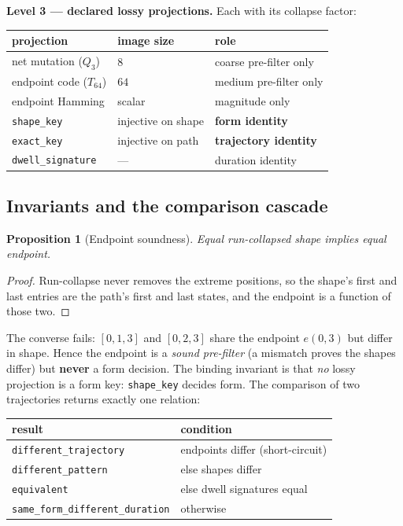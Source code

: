 \documentclass[11pt,a4paper]{article}
\newtheorem{proposition}{Proposition}
\begin{document}
\textbf{Level 3 --- declared lossy projections.} Each with its collapse factor:
\begin{center}
\begin{tabular}{lll}
\toprule
projection & image size & role \\
\midrule
net mutation ($Q_3$) & $8$ & coarse pre-filter only \\
endpoint code ($T_{64}$) & $64$ & medium pre-filter only \\
endpoint Hamming & scalar & magnitude only \\
\texttt{shape\_key} & injective on shape & \textbf{form identity} \\
\texttt{exact\_key} & injective on path & \textbf{trajectory identity} \\
\texttt{dwell\_signature} & --- & duration identity \\
\bottomrule
\end{tabular}
\end{center}

\subsection{Invariants and the comparison cascade}
\begin{proposition}[Endpoint soundness]
Equal run-collapsed shape implies equal endpoint.
\end{proposition}
\begin{proof}
Run-collapse never removes the extreme positions, so the shape's first and last
entries are the path's first and last states, and the endpoint is a function of
those two. \end{proof}
The converse fails: $[0,1,3]$ and $[0,2,3]$ share the endpoint $e(0,3)$ but differ
in shape. Hence the endpoint is a \emph{sound pre-filter} (a mismatch proves the
shapes differ) but \textbf{never} a form decision. The binding invariant is that
\emph{no} lossy projection is a form key: \texttt{shape\_key} decides form. The
comparison of two trajectories returns exactly one relation:
\begin{center}
\begin{tabular}{ll}
\toprule
result & condition \\
\midrule
\texttt{different\_trajectory} & endpoints differ (short-circuit) \\
\texttt{different\_pattern} & else shapes differ \\
\texttt{equivalent} & else dwell signatures equal \\
\texttt{same\_form\_different\_duration} & otherwise \\
\bottomrule
\end{tabular}
\end{center}
\end{document}
